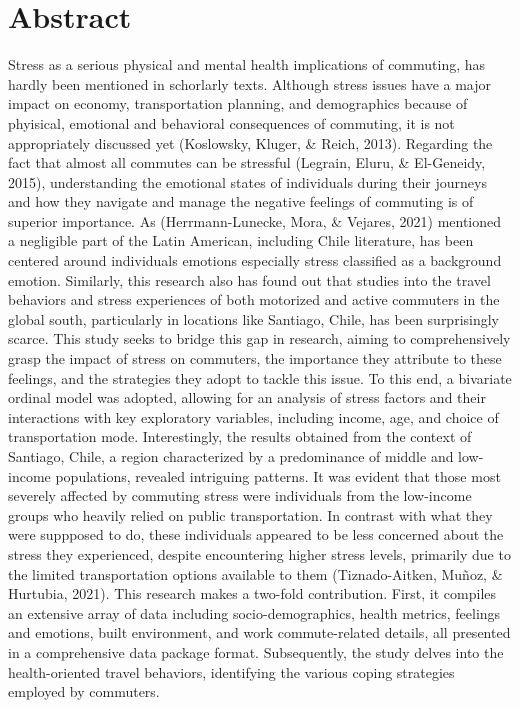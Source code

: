 \documentclass[
11pt, %
oneside, %
english, %
singlespacing, %
]{macthesis} %
\begin{document}
\section*{\Huge Abstract}
\addchaptertocentry{\abstractname}
Stress as a serious physical and mental health implications of commuting, has hardly been mentioned in schorlarly texts. Although stress issues have a major impact on economy, transportation planning, and demographics because of phyisical, emotional and behavioral consequences of commuting, it is not appropriately discussed yet (Koslowsky, Kluger, \& Reich, 2013). Regarding the fact that almost all commutes can be stressful (Legrain, Eluru, \& El-Geneidy, 2015), understanding the emotional states of individuals during their journeys and how they navigate and manage the negative feelings of commuting is of superior importance. As (Herrmann-Lunecke, Mora, \& Vejares, 2021) mentioned a negligible part of the Latin American, including Chile literature, has been centered around individuals emotions especially stress classified as a background emotion. Similarly, this research also has found out that studies into the travel behaviors and stress experiences of both motorized and active commuters in the global south, particularly in locations like Santiago, Chile, has been surprisingly scarce. This study seeks to bridge this gap in research, aiming to comprehensively grasp the impact of stress on commuters, the importance they attribute to these feelings, and the strategies they adopt to tackle this issue. To this end, a bivariate ordinal model was adopted, allowing for an analysis of stress factors and their interactions with key exploratory variables, including income, age, and choice of transportation mode. Interestingly, the results obtained from the context of Santiago, Chile, a region characterized by a predominance of middle and low-income populations, revealed intriguing patterns. It was evident that those most severely affected by commuting stress were individuals from the low-income groups who heavily relied on public transportation. In contrast with what they were suppposed to do, these individuals appeared to be less concerned about the stress they experienced, despite encountering higher stress levels, primarily due to the limited transportation options available to them (Tiznado-Aitken, Muñoz, \& Hurtubia, 2021).
This research makes a two-fold contribution. First, it compiles an extensive array of data including socio-demographics, health metrics, feelings and emotions, built environment, and work commute-related details, all presented in a comprehensive data package format. Subsequently, the study delves into the health-oriented travel behaviors, identifying the various coping strategies employed by commuters.
\end{document}
